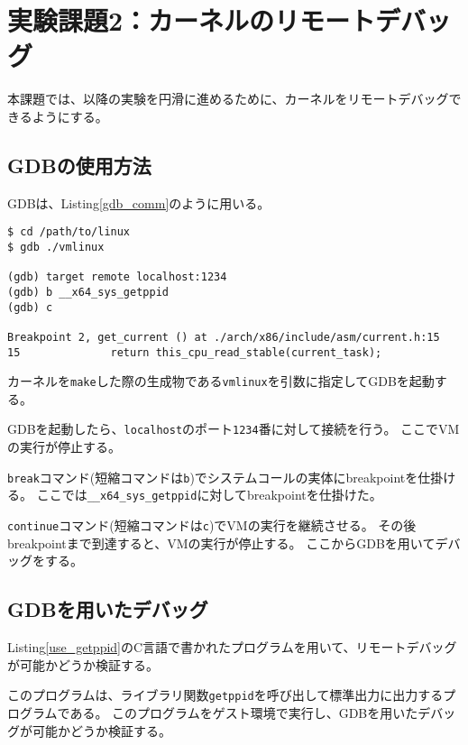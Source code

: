 \documentclass[main]{subfiles}
\begin{document}
\section{実験課題2：カーネルのリモートデバッグ}

本課題では、以降の実験を円滑に進めるために、カーネルをリモートデバッグできるようにする。

\subsection{GDBの使用方法}

GDBは、Listing\ref{gdb_comm}のように用いる。

\begin{lstlisting}[label=gdb_comm,caption=GDBの使用の様子]
$ cd /path/to/linux
$ gdb ./vmlinux

(gdb) target remote localhost:1234
(gdb) b __x64_sys_getppid
(gdb) c

Breakpoint 2, get_current () at ./arch/x86/include/asm/current.h:15
15              return this_cpu_read_stable(current_task);
\end{lstlisting}

カーネルを\texttt{make}した際の生成物である\texttt{vmlinux}を引数に指定してGDBを起動する。

GDBを起動したら、\texttt{localhost}のポート\texttt{1234}番に対して接続を行う。
ここでVMの実行が停止する。

\texttt{break}コマンド(短縮コマンドは\texttt{b})でシステムコールの実体にbreakpointを仕掛ける。
ここでは\texttt{\_\_x64\_sys\_getppid}に対してbreakpointを仕掛けた。

\texttt{continue}コマンド(短縮コマンドは\texttt{c})でVMの実行を継続させる。
その後breakpointまで到達すると、VMの実行が停止する。
ここからGDBを用いてデバッグをする。

\subsection{GDBを用いたデバッグ}

Listing\ref{use_getppid}のC言語で書かれたプログラムを用いて、リモートデバッグが可能かどうか検証する。



このプログラムは、ライブラリ関数\texttt{getppid}を呼び出して標準出力に出力するプログラムである。
このプログラムをゲスト環境で実行し、GDBを用いたデバッグが可能かどうか検証する。
\end{document}
